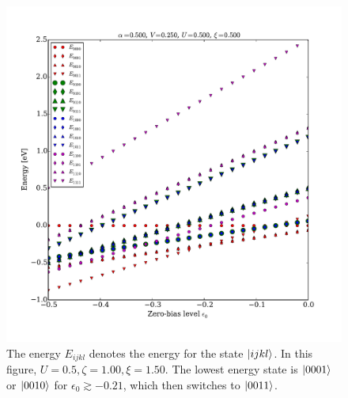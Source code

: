 \begin{figure}[h]
    \centering
    \includegraphics[height=.45\textheight]{pdf/energy/pespin_distribution_u3_k1.pdf}
    \caption{The energy $E_{ijkl}$ denotes the energy for the state $\ket{ijkl}$. In this figure, $U=0.5, \zeta=1.00, \xi=1.50$. The lowest energy state is $\ket{0001}$ or $\ket{0010}$ for $\epsilon_0 \gtrsim -0.21$, which then switches to $\ket{0011}$.}
    \label{fig:perspinenergy31}
\end{figure} 
